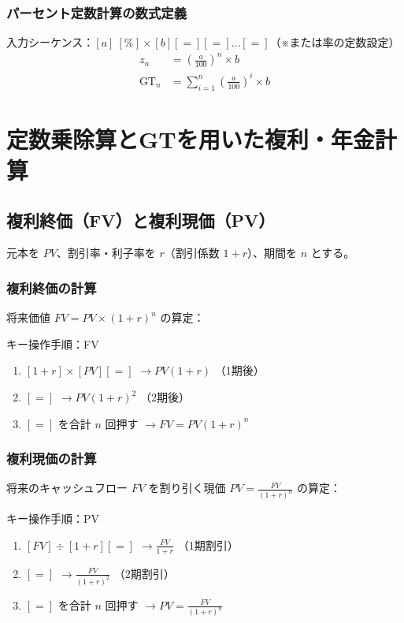 \subsection{パーセント定数計算の数式定義}
入力シーケンス：$[a] \ [\%] \times [b] [=] [=] \dots [=]$（※または率の定数設定）
\begin{align}
    z_n &= \left(\frac{a}{100}\right)^n \times b \\
    \text{GT}_n &= \sum_{i=1}^n \left(\frac{a}{100}\right)^i \times b
\end{align}

\chapter{定数乗除算とGTを用いた複利・年金計算}

\section{複利終価（FV）と複利現価（PV）}
元本を $PV$、割引率・利子率を $r$（割引係数 $1+r$）、期間を $n$ とする。

\subsection{複利終価の計算}
将来価値 $FV = PV \times (1+r)^n$ の算定：
\begin{calcbox}{キー操作手順：FV}
\begin{enumerate}
    \item $[1 + r] \times [PV] [=]$ $\to PV(1+r)$ （1期後）
    \item $[=]$ $\to PV(1+r)^2$ （2期後）
    \item $[=]$ を合計 $n$ 回押す $\to FV = PV(1+r)^n$
\end{enumerate}
\end{calcbox}

\subsection{複利現価の計算}
将来のキャッシュフロー $FV$ を割り引く現価 $PV = \frac{FV}{(1+r)^n}$ の算定：
\begin{calcbox}{キー操作手順：PV}
\begin{enumerate}
    \item $[FV] \div [1 + r] [=]$ $\to \frac{FV}{1+r}$ （1期割引）
    \item $[=]$ $\to \frac{FV}{(1+r)^2}$ （2期割引）
    \item $[=]$ を合計 $n$ 回押す $\to PV = \frac{FV}{(1+r)^n}$
\end{enumerate}
\end{calcbox}

